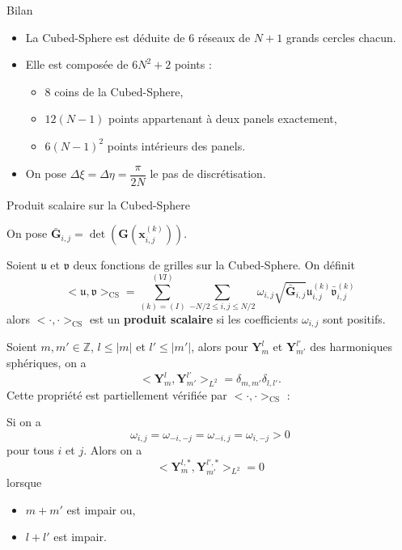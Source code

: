 \documentclass[11pt]{beamer}
\def\CS{\text{CS}}
\def\gsum{\displaystyle\sum\limits}
\begin{document}
\begin{frame}{Bilan}
\begin{itemize}
\item La Cubed-Sphere est déduite de 6 réseaux de $N+1$ grands cercles chacun.

\item Elle est composée de $6N^2+2$ points :
\begin{itemize}
\item $8$ coins de la Cubed-Sphere,
\item $12(N-1)$ points appartenant à deux panels exactement,
\item $6(N-1)^2$ points intérieurs des panels.
\end{itemize}

\item On pose $\Delta \xi = \Delta \eta = \dfrac{\pi}{2N}$ le pas de discrétisation.
\end{itemize}
\end{frame}















\begin{frame}{Produit scalaire sur la Cubed-Sphere}

On pose $\bar{\mathbf{G}}_{i,j} = \det ( \mathbf{G}(\mathbf{x}_{i,j}^{(k)}))$.

\begin{block}{}
Soient $\mathfrak{u}$ et $\mathfrak{v}$ deux fonctions de grilles sur la Cubed-Sphere. On définit
$$<\mathfrak{u},\mathfrak{v}>_{\CS} = \gsum_{(k) = (I)}^{(VI)} \gsum_{-N/2 \leq i,j \leq N/2} \omega_{i,j} \sqrt{\bar{\mathbf{G}}_{i,j}} \mathfrak{u}_{i,j}^{(k)} \bar{\mathfrak{v}}_{i,j}^{(k)}$$
alors $<\cdot, \cdot>_{\CS}$ est un \textbf{produit scalaire} si les coefficients $\omega_{i,j}$ sont positifs.
\end{block}
\end{frame}




\begin{frame}
Soient $m, m' \in \mathbb{Z}$, $l \leq |m|$ et $l' \leq |m'|$, alors pour $\mathbf{Y}_m^l$ et $\mathbf{Y}_{m'}^{l'}$ des harmoniques sphériques, on a 
$$
<\mathbf{Y}_m^l, \mathbf{Y}_{m'}^{l'}>_{L^2} = \delta_{m,m'}\delta_{l,l'}.
$$
Cette propriété est partiellement vérifiée par $<\cdot, \cdot>_{\CS}$ :

\begin{block}{}
Si on a
$$
\omega_{i,j} = \omega_{-i,-j} = \omega_{-i,j} = \omega_{i,-j}>0
$$
pour tous $i$ et $j$. Alors on a
$$
<\mathbf{Y}_m^{l,*}, \mathbf{Y}_{m'}^{l',*}>_{L^2} = 0
$$
lorsque
\begin{itemize}
\item $m+m'$ est impair ou,
\item $l+l'$ est impair.
\end{itemize}
\end{block}
\end{frame}
\end{document}
